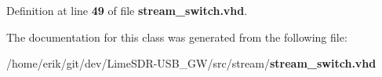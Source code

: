 Definition at line {\bf 49} of file {\bf stream\+\_\+switch.\+vhd}.



The documentation for this class was generated from the following file\+:\begin{DoxyCompactItemize}
\item 
/home/erik/git/dev/\+Lime\+S\+D\+R-\/\+U\+S\+B\+\_\+\+G\+W/src/stream/{\bf stream\+\_\+switch.\+vhd}\end{DoxyCompactItemize}
